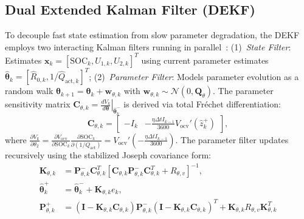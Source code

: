 \documentclass[balance,nocopyright,upint,varvw,hyphenate,barcolor=NavyBlue,nolists]{asmejour}
\begin{document}
\subsection{Dual Extended Kalman Filter (DEKF)}
To decouple fast state estimation from slow parameter degradation, the DEKF employs two interacting Kalman filters running in parallel~\cite{Plett2004part3,Charkhgard2010dekf}: (1)~\emph{State Filter}: Estimates $\mathbf{x}_k = [\text{SOC}_k, U_{1,k}, U_{2,k}]^T$ using current parameter estimates $\hat{\boldsymbol{\theta}}_k = [\hat{R}_{0,k}, 1/\hat{Q}_{\text{act},k}]^T$; (2)~\emph{Parameter Filter}: Models parameter evolution as a random walk $\boldsymbol{\theta}_{k+1} = \boldsymbol{\theta}_k + \mathbf{w}_{\theta,k}$ with $\mathbf{w}_{\theta,k} \sim \mathcal{N}(0, \mathbf{Q}_\theta)$. The parameter sensitivity matrix $\mathbf{C}_{\theta,k} = \left. \frac{d V_k}{d \boldsymbol{\theta}} \right|_{\hat{\boldsymbol{\theta}}_k^-}$ is derived via total Fréchet differentiation:
\begin{equation}\label{eqn:dekf_param_jacobian}
\mathbf{C}_{\theta,k} = \begin{bmatrix} -I_k & -\frac{\eta \Delta t I_{k-1}}{3600} V_{\text{ocv}}'(\hat{z}_k^+) \end{bmatrix},
\end{equation}
where $\frac{\partial V_k}{\partial \theta_2} = \frac{\partial V_{\text{ocv}}}{\partial \text{SOC}_k} \frac{\partial \text{SOC}_k}{\partial (1/Q_{\text{act}})} = V_{\text{ocv}}' \left(-\frac{\eta \Delta t I_{k-1}}{3600}\right)$. The parameter filter updates recursively using the stabilized Joseph covariance form:
\begin{align}
\mathbf{K}_{\theta,k} &= \mathbf{P}_{\theta,k}^- \mathbf{C}_{\theta,k}^T [ \mathbf{C}_{\theta,k} \mathbf{P}_{\theta,k}^- \mathbf{C}_{\theta,k}^T + R_{\theta,v} ]^{-1}, \label{eqn:dekf_param_gain}\\
\hat{\boldsymbol{\theta}}_k^+ &= \hat{\boldsymbol{\theta}}_k^- + \mathbf{K}_{\theta,k} e_k, \label{eqn:dekf_param_upd}\\
\mathbf{P}_{\theta,k}^+ &= (\mathbf{I} - \mathbf{K}_{\theta,k} \mathbf{C}_{\theta,k}) \mathbf{P}_{\theta,k}^- (\mathbf{I} - \mathbf{K}_{\theta,k} \mathbf{C}_{\theta,k})^T + \mathbf{K}_{\theta,k} R_{\theta,v} \mathbf{K}_{\theta,k}^T \label{eqn:dekf_param_cov}
\end{align}
\end{document}

